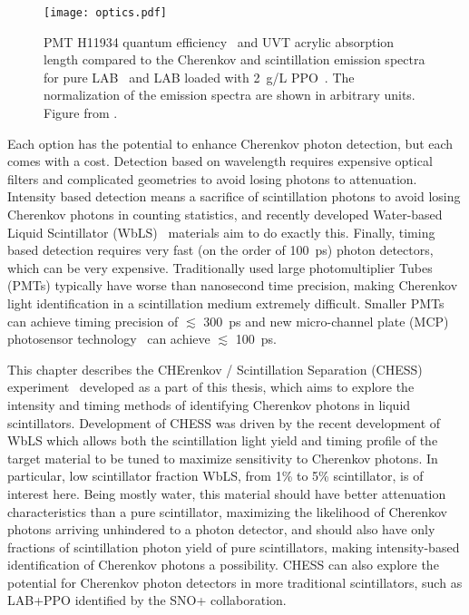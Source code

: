 \begin{figure}
	\centering
	\texttt{[image: optics.pdf]}
	\caption{\label{fig:optics} PMT H11934 quantum efficiency~\cite{h11934} and UVT acrylic absorption length compared to the Cherenkov and scintillation emission spectra for pure LAB~\cite{lab_emission} and LAB loaded with 2~g/L PPO~\cite{snop_private}. The normalization of the emission spectra are shown in arbitrary units. Figure from \cite{chess_nim}.}
\end{figure}

Each option has the potential to enhance Cherenkov photon detection, but each comes with a cost.
Detection based on wavelength requires expensive optical filters and complicated geometries to avoid losing photons to attenuation.
Intensity based detection means a sacrifice of scintillation photons to avoid losing Cherenkov photons in counting statistics, and recently developed Water-based Liquid Scintillator (WbLS)~\cite{wbls} materials aim to do exactly this.
Finally, timing based detection requires very fast (on the order of 100~ps) photon detectors, which can be very expensive.
Traditionally used large photomultiplier Tubes (PMTs) typically have worse than nanosecond time precision, making Cherenkov light identification in a scintillation medium extremely difficult. 
Smaller PMTs~\cite{h11934} can achieve timing precision of $\lesssim$ 300~ps and new micro-channel plate (MCP) photosensor technology~\cite{mcp, lappd, lappd2} can achieve  $\lesssim$ 100~ps.


This chapter describes the CHErenkov / Scintillation Separation (CHESS) experiment~\cite{chess_nim} developed as a part of this thesis, which aims to explore the intensity and timing methods of identifying Cherenkov photons in liquid scintillators. 
Development of CHESS was driven by the recent development of WbLS which allows both the scintillation light yield and timing profile of the target material to be tuned to maximize sensitivity to Cherenkov photons.  
In particular, low scintillator fraction WbLS, from 1\% to 5\% scintillator, is of interest here. 
Being mostly water, this material should have better attenuation characteristics than a pure scintillator, maximizing the likelihood of Cherenkov photons arriving unhindered to a photon detector, and should also have only fractions of scintillation photon yield of pure scintillators, making intensity-based identification of Cherenkov photons a possibility.
CHESS can also explore the potential for Cherenkov photon detectors in more traditional scintillators, such as LAB+PPO identified by the SNO+ collaboration.

